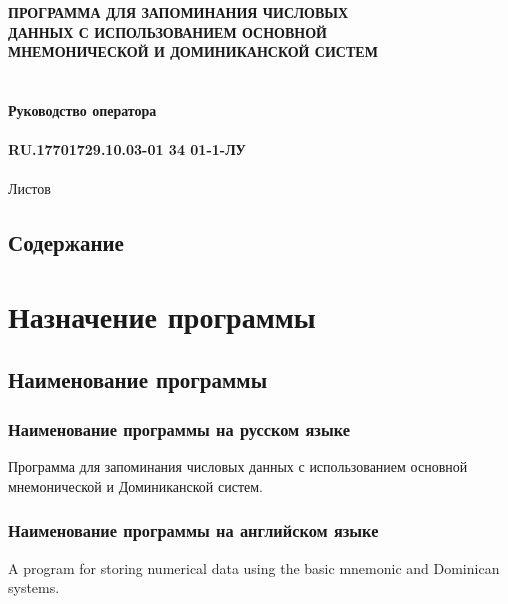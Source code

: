 \documentclass[draft]{article}
\begin{document}
\bigskip
\begin{center}
\topskip=0pt
\vspace*{\fill}
\textbf{ПРОГРАММА ДЛЯ ЗАПОМИНАНИЯ ЧИСЛОВЫХ\\
 ДАННЫХ С ИСПОЛЬЗОВАНИЕМ ОСНОВНОЙ\\
 МНЕМОНИЧЕСКОЙ И ДОМИНИКАНСКОЙ СИСТЕМ\\
~\\
~\\
Руководство оператора\\
~\\
RU.17701729.10.03-01 34 01-1-ЛУ}\\
~\\
Листов \ztotpages\\
\vspace*{\fill}
\end{center}
\begin{center}
\end{center}
\newpage
\begin{center}
\section {Содержание}
\tableofcontents
\end{center}
\newpage
\section{Назначение программы}
\subsection{Наименование программы}
\subsubsection{Наименование программы на русском языке}
Программа для запоминания числовых данных с использованием основной мнемонической и Доминиканской систем.
\subsubsection{Наименование программы на английском языке}
A program for storing numerical data using the basic mnemonic and Dominican systems.
\end{document}
